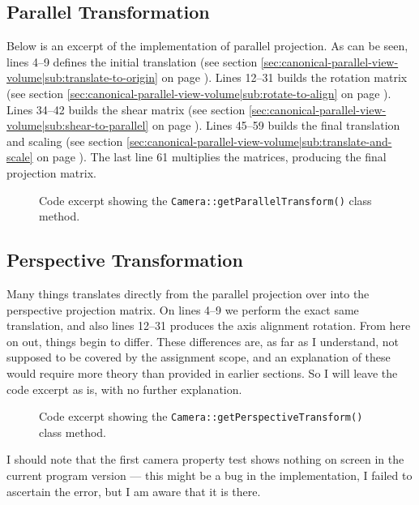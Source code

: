 \documentclass[11pt]{article}
\newcommand{\secref}[1]{see section \ref{#1} on page \pageref{#1}}
\newcommand{\code}[1]{{\tt #1}}
\begin{document}
\subsection{Parallel Transformation}
Below is an excerpt of the implementation of parallel projection. As can be
seen, lines 4--9 defines the initial translation
(\secref{sec:canonical-parallel-view-volume|sub:translate-to-origin}). Lines
12--31 builds the rotation matrix
(\secref{sec:canonical-parallel-view-volume|sub:rotate-to-align}). Lines
34--42 builds the shear matrix
(\secref{sec:canonical-parallel-view-volume|sub:shear-to-parallel}). Lines
45--59 builds the final translation and scaling
(\secref{sec:canonical-parallel-view-volume|sub:translate-and-scale}). The
last line 61 multiplies the matrices, producing the final projection matrix.

\begin{figure}[H]
    
    \caption{Code excerpt showing the
    \code{Camera::getParallelTransform()} class method.}
    \label{code:get-parallel-transform}
\end{figure}

\subsection{Perspective Transformation}
Many things translates directly from the parallel projection over into the
perspective projection matrix. On lines 4--9 we perform the exact same
translation, and also lines 12--31 produces the axis alignment rotation. From
here on out, things begin to differ. These differences are, as far as I
understand, not supposed to be covered by the assignment scope, and an
explanation of these would require more theory than provided in earlier
sections. So I will leave the code excerpt as is, with no further explanation.
\\

\begin{figure}[H]
    
    \caption{Code excerpt showing the
    \code{Camera::getPerspectiveTransform()} class method.}
    \label{code:get-perspective-transform}
\end{figure}
I should note that the first camera property test shows nothing on screen in
the current program version --- this might be a bug in the implementation, I
failed to ascertain the error, but I am aware that it is there.
\end{document}
